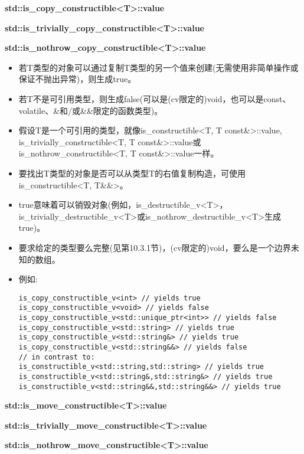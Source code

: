 \textbf{std::is\_copy\_constructible<T>::value}

\textbf{std::is\_trivially\_copy\_constructible<T>::value}

\textbf{std::is\_nothrow\_copy\_constructible<T>::value}

\begin{itemize}
\item 
若T类型的对象可以通过复制T类型的另一个值来创建(无需使用非简单操作或保证不抛出异常)，则生成true。

\item 
若T不是可引用类型，则生成false(可以是(cv限定的)void，也可以是const、volatile、\&和/或\&\&限定的函数类型)。

\item 
假设T是一个可引用的类型，就像is\_constructible<T, T const\&>::value, is\_trivially\_constructible<T, T const\&>::value或is\_nothrow\_constructible<T, T const\&>::value一样。

\item 
要找出T类型的对象是否可以从类型T的右值复制构造，可使用is\_constructible<T, T\&\&>。

\item 
true意味着可以销毁对象(例如，is\_destructible\_v<T>，is\_trivially\_destructible\_v<T>或is\_nothrow\_destructible\_v<T>生成true)。

\item 
要求给定的类型要么完整(见第10.3.1节)，(cv限定的)void，要么是一个边界未知的数组。

\item 
例如:
\begin{lstlisting}[style=styleCXX]
is_copy_constructible_v<int> // yields true
is_copy_constructible_v<void> // yields false
is_copy_constructible_v<std::unique_ptr<int>> // yields false
is_copy_constructible_v<std::string> // yields true
is_copy_constructible_v<std::string&> // yields true
is_copy_constructible_v<std::string&&> // yields false
// in contrast to:
is_constructible_v<std::string,std::string> // yields true
is_constructible_v<std::string&,std::string&> // yields true
is_constructible_v<std::string&&,std::string&&> // yields true
\end{lstlisting}

\end{itemize}

\textbf{std::is\_move\_constructible<T>::value}

\textbf{std::is\_trivially\_move\_constructible<T>::value}

\textbf{std::is\_nothrow\_move\_constructible<T>::value}


